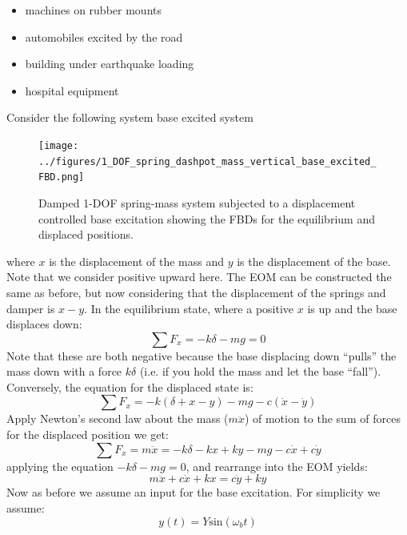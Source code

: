 \documentclass[12pt,letter]{article}
\numberwithin{ex}{section} %
\numberwithin{re}{section} %
\numberwithin{pr}{section} %
\begin{document}
			\begin{itemize}
			\item machines on rubber mounts
			\item automobiles excited by the road
			\item building under earthquake loading
			\item hospital equipment
			\end{itemize}
			
			Consider the following system base excited system
			\begin{figure}[H]
				\centering
				\texttt{[image: ../figures/1\_DOF\_spring\_dashpot\_mass\_vertical\_base\_excited\_FBD.png]}
				\caption{Damped 1-DOF spring-mass system subjected to a displacement controlled base excitation showing the FBDs for the equilibrium and displaced positions.}
				\label{fig:1_DOF_spring_dashpot_mass_vertical_base_excited_FBD}
			\end{figure}
			where $x$ is the displacement of the mass and $y$ is the displacement of the base. Note that we consider positive upward here. The EOM can be constructed the same as before, but now considering that the displacement of the springs and damper is $x-y$.  In the equilibrium state, where a positive $x$ is up and the base displaces down:
			\begin{equation}
			\sum F_x = -k\delta -mg =0
			\end{equation}	
			Note that these are both negative because the base displacing down ``pulls'' the mass down with a force $k\delta$ (i.e. if you hold the mass and let the base ``fall''). Conversely, the equation for the displaced state is:
			\begin{equation}
			\sum F_x = -k(\delta + x - y) -mg -c(\dot{x} -\dot{y})
			\end{equation}	
			Apply Newton's second law about the mass ($m\ddot{x}$) of motion to the sum of forces for the displaced position we get:
			\begin{equation}
			\sum F_x = m\ddot{x} = -k\delta -kx + ky -mg -c\dot{x} +c\dot{y}
			\end{equation}	
			applying the equation $-k\delta -mg =0$, and rearrange into the EOM yields:	
			\begin{equation}
			m\ddot{x} + c\dot{x} + kx = c\dot{y} + ky 
			\end{equation}
			Now as before we assume an input for the base excitation. For simplicity we assume:
			\begin{equation}
			y(t) = Y\text{sin}(\omega_b t)
			\end{equation}
\end{document}
